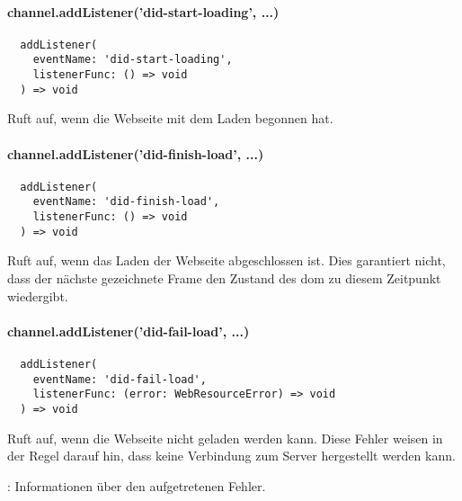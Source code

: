 
\newpage

\paragraph{channel.addListener('did-start-loading', ...)}

\begin{verbatim}
  addListener(
    eventName: 'did-start-loading',
    listenerFunc: () => void
  ) => void
\end{verbatim}

Ruft  auf, wenn die Webseite mit dem Laden begonnen hat.


\paragraph{channel.addListener('did-finish-load', ...)}

\begin{verbatim}
  addListener(
    eventName: 'did-finish-load',
    listenerFunc: () => void
  ) => void
\end{verbatim}

Ruft  auf, wenn das Laden der Webseite abgeschlossen ist.
Dies garantiert nicht, dass der nächste gezeichnete Frame den Zustand des \ac{dom} zu diesem Zeitpunkt wiedergibt.


\paragraph{channel.addListener('did-fail-load', ...)}

\begin{verbatim}
  addListener(
    eventName: 'did-fail-load',
    listenerFunc: (error: WebResourceError) => void
  ) => void
\end{verbatim}

Ruft  auf, wenn die Webseite nicht geladen werden kann.
Diese Fehler weisen in der Regel darauf hin, dass keine Verbindung zum Server hergestellt werden kann.

\begin{arguments}
  \item {}: Informationen über den aufgetretenen Fehler.
\end{arguments}

